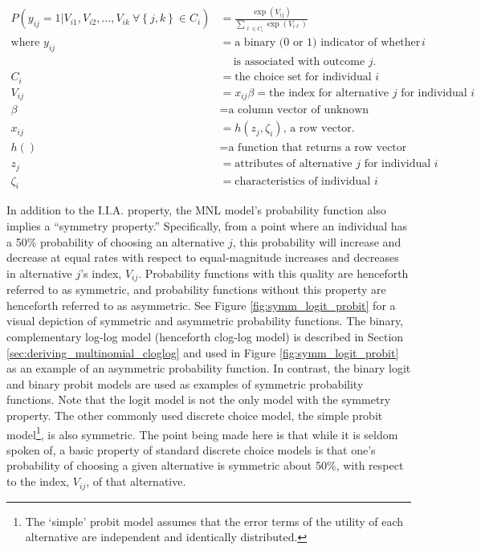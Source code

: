 \begin{equation}
\label{eq:mnl_formula}
\begin{aligned}
P \left( y_{ij} = 1 | V_{i1}, V_{i2}, ..., V_{ik} \ \forall \left\lbrace j, k \right\rbrace \in C_i \right) &= \frac{\exp \left( V_{ij} \right)}{\sum _{\ell \in C_i} \exp \left( V_{i \ell} \right)} \\
\textrm{where } y_{ij} &= \textrm{a binary (0 or 1) indicator of whether individual $i$} \\
&\quad \  \textrm{is associated with outcome $j$.} \\
C_i &= \textrm{the choice set for individual $i$} \\
V_{ij} &= x_{ij} \beta = \textrm{the index for alternative $j$ for individual $i$} \\
\beta &= \textrm{a column vector of unknown population parameters} \\
x_{ij} &= h \left( z_j, \zeta _i \right) \textrm{, a row vector.} \\
h \left(  \right) &= \textrm{a function that returns a row vector} \\
z _j &= \textrm{attributes of alternative $j$ for individual $i$} \\
\zeta _i &= \textrm{characteristics of individual $i$}
\end{aligned}
\end{equation}

In addition to the I.I.A. property, the MNL model's probability function also implies a ``symmetry property.'' Specifically, from a point where an individual has a 50\% probability of choosing an alternative $j$, this probability will increase and decrease at equal rates with respect to equal-magnitude increases and decreases in alternative $j$'s index, $V_{ij}$. Probability functions with this quality are henceforth referred to as symmetric, and probability functions without this property are henceforth referred to as asymmetric. See Figure \ref{fig:symm_logit_probit} for a visual depiction of symmetric and asymmetric probability functions. The binary, complementary log-log model (henceforth clog-log model) is described in Section \ref{sec:deriving_multinomial_cloglog} and used in Figure \ref{fig:symm_logit_probit} as an example of an asymmetric probability function. In contrast, the binary logit and binary probit models are used as examples of symmetric probability functions. Note that the logit model is not the only model with the symmetry property. The other commonly used discrete choice model, the simple probit model\footnote{The `simple' probit model assumes that the error terms of the utility of each alternative are independent and identically distributed.}, is also symmetric. The point being made here is that while it is seldom spoken of, a basic property of standard discrete choice models is that one's probability of choosing a given alternative is symmetric about 50\%, with respect to the index, $V_{ij}$, of that alternative.

